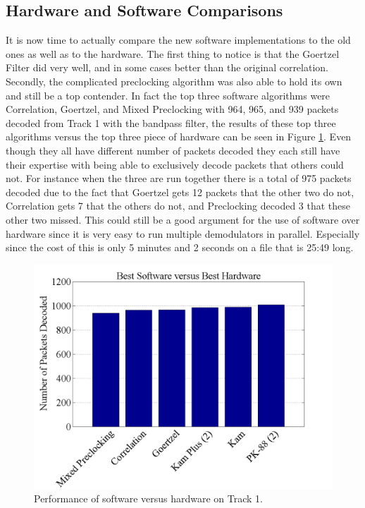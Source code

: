 \subsection{Hardware and Software Comparisons}
It is now time to actually compare the new software implementations to the old ones as well as to the hardware. The first thing to notice is that the Goertzel Filter did very well, and in some cases better than the original correlation. Secondly, the complicated preclocking algorithm was also able to hold its own and still be a top contender. In fact the top three software algorithms were Correlation, Goertzel, and Mixed Preclocking with 964, 965, and 939 packets decoded from Track 1 with the bandpass filter, the results of these top three algorithms versus the top three piece of hardware can be seen in Figure \ref{bestHardSoft}. Even though they all have different number of packets decoded they each still have their expertise with being able to exclusively decode packets that others could not. For instance when the three are run together there is a total of 975 packets decoded due to the fact that Goertzel gets 12 packets that the other two do not, Correlation gets 7 that the others do not, and Preclocking decoded 3 that these other two missed. This could still be a good argument for the use of software over hardware since it is very easy to run multiple demodulators in parallel. Especially since the cost of this is only 5 minutes and 2 seconds on a file that is 25:49 long.

\begin{figure}
  \centering
	\includegraphics[width=0.75\linewidth]{images/BestSoftwareversusBestHardware.png} 
	\caption{Performance of software versus hardware on Track 1.}
   \label{bestHardSoft}
\end{figure}

